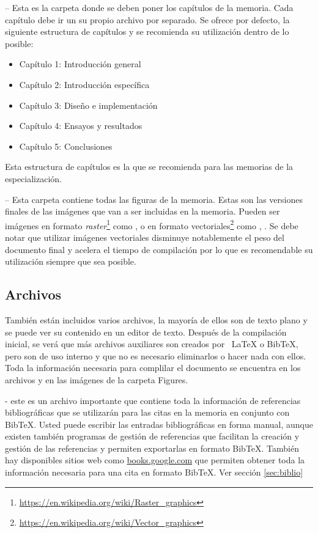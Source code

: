  -- Esta es la carpeta donde se deben poner los capítulos de la memoria. Cada capítulo debe ir un su propio archivo  por separado.  Se ofrece por defecto, la siguiente estructura de capítulos y se recomienda su utilización dentro de lo posible:

\begin{itemize}
\item Capítulo 1: Introducción general	
\item Capítulo 2: Introducción específica
\item Capítulo 3: Diseño e implementación
\item Capítulo 4: Ensayos y resultados
\item Capítulo 5: Conclusiones

\end{itemize}

Esta estructura de capítulos es la que se recomienda para las memorias de la especialización.

 -- Esta carpeta contiene todas las figuras de la memoria.  Estas son las versiones finales de las imágenes que van a ser incluidas en la memoria.  Pueden ser imágenes en formato \textit{raster}\footnote{\url{https://en.wikipedia.org/wiki/Raster_graphics}} como ,  o en formato vectoriales\footnote{\url{https://en.wikipedia.org/wiki/Vector_graphics}} como , .  Se debe notar que utilizar imágenes vectoriales disminuye notablemente el peso del documento final y acelera el tiempo de compilación por lo que es recomendable su utilización siempre que sea posible.

\subsection{Archivos}

También están incluidos varios archivos, la mayoría de ellos son de texto plano y se puede ver su contenido en un editor de texto. Después de la compilación inicial, se verá que más archivos auxiliares son creados por \ LaTeX{} o BibTeX, pero son de uso interno y que no es necesario eliminarlos o hacer nada con ellos.  Toda la información necesaria para complilar el documento se encuentra en los archivos  y en las imágenes de la carpeta Figures.

 - este es un archivo importante que contiene toda la información de referencias bibliográficas que se utilizarán para las citas en la memoria en conjunto con BibTeX. Usted puede escribir las entradas bibliográficas en forma manual, aunque existen también programas de gestión de referencias que facilitan la creación y gestión de las referencias y permiten exportarlas en formato BibTeX.  También hay disponibles sitios web como \url{books.google.com} que permiten obtener toda la información necesaria para una cita en formato BibTeX. Ver sección \ref{sec:biblio}

